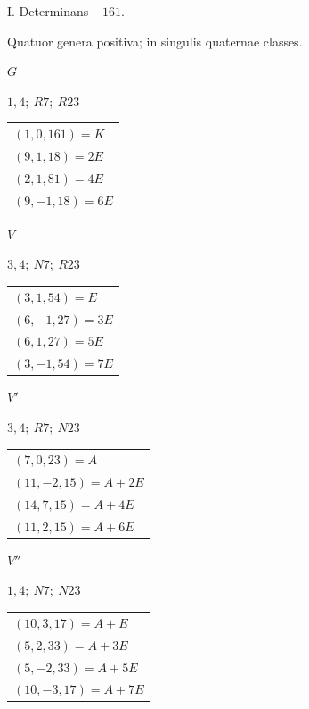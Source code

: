 \begin{center}I. Determinans \(-161\).\par\smallskip Quatuor genera positiva; in singulis quaternae classes.\end{center}
\begin{center}
\begin{minipage}[t]{0.47\linewidth}\centering
\(G\)\par\smallskip
{\small \(1,4;\ R7;\ R23\)}\par\smallskip
\begin{tabular}{@{}l@{}}
\((1,0,161)=K\)\\\((9,1,18)=2E\)\\\((2,1,81)=4E\)\\\((9,-1,18)=6E\)
\end{tabular}
\end{minipage}\hfill\begin{minipage}[t]{0.47\linewidth}\centering
\(V\)\par\smallskip
{\small \(3,4;\ N7;\ R23\)}\par\smallskip
\begin{tabular}{@{}l@{}}
\((3,1,54)=E\)\\\((6,-1,27)=3E\)\\\((6,1,27)=5E\)\\\((3,-1,54)=7E\)
\end{tabular}
\end{minipage}
\end{center}
\begin{center}
\begin{minipage}[t]{0.47\linewidth}\centering
\(V'\)\par\smallskip
{\small \(3,4;\ R7;\ N23\)}\par\smallskip
\begin{tabular}{@{}l@{}}
\((7,0,23)=A\)\\\((11,-2,15)=A+2E\)\\\((14,7,15)=A+4E\)\\\((11,2,15)=A+6E\)
\end{tabular}
\end{minipage}\hfill\begin{minipage}[t]{0.47\linewidth}\centering
\(V''\)\par\smallskip
{\small \(1,4;\ N7;\ N23\)}\par\smallskip
\begin{tabular}{@{}l@{}}
\((10,3,17)=A+E\)\\\((5,2,33)=A+3E\)\\\((5,-2,33)=A+5E\)\\\((10,-3,17)=A+7E\)
\end{tabular}
\end{minipage}
\end{center}
